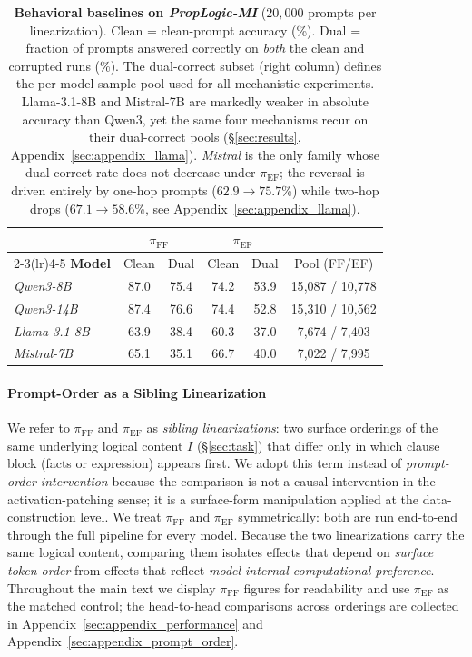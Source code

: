 \documentclass[11pt]{article}
\begin{document}
\begin{table}[t]
\centering
\small
\setlength{\tabcolsep}{3.5pt}
\begin{tabular}{l cc cc c}
\toprule
& \multicolumn{2}{c}{$\pi_{\mathrm{FF}}$} & \multicolumn{2}{c}{$\pi_{\mathrm{EF}}$} & \\
\cmidrule(lr){2-3}\cmidrule(lr){4-5}
\textbf{Model} & Clean & Dual & Clean & Dual & Pool (FF/EF) \\
\midrule
\textit{Qwen3-8B}            & 87.0 & 75.4 & 74.2 & 53.9 & 15{,}087 / 10{,}778 \\
\textit{Qwen3-14B}           & 87.4 & 76.6 & 74.4 & 52.8 & 15{,}310 / 10{,}562 \\
\textit{Llama-3.1-8B}        & 63.9 & 38.4 & 60.3 & 37.0 & \phantom{0}7{,}674 / \phantom{0}7{,}403 \\
\textit{Mistral-7B}          & 65.1 & 35.1 & 66.7 & 40.0 & \phantom{0}7{,}022 / \phantom{0}7{,}995 \\
\bottomrule
\end{tabular}
\caption{\textbf{Behavioral baselines on \textit{PropLogic-MI}} ($20{,}000$ prompts per linearization). Clean = clean-prompt accuracy (\%). Dual = fraction of prompts answered correctly on \emph{both} the clean and corrupted runs (\%). The dual-correct subset (right column) defines the per-model sample pool used for all mechanistic experiments. Llama-3.1-8B and Mistral-7B are markedly weaker in absolute accuracy than Qwen3, yet the same four mechanisms recur on their dual-correct pools (\S\ref{sec:results}, Appendix~\ref{sec:appendix_llama}). \textit{Mistral} is the only family whose dual-correct rate does not decrease under $\pi_{\mathrm{EF}}$; the reversal is driven entirely by one-hop prompts ($62.9 \to 75.7$\%) while two-hop drops ($67.1 \to 58.6$\%, see Appendix~\ref{sec:appendix_llama}).}
\label{tab:dataset_baselines}
\vspace{-0.6em}
\end{table}

\paragraph{Prompt-Order as a Sibling Linearization}
We refer to $\pi_{\mathrm{FF}}$ and $\pi_{\mathrm{EF}}$ as \emph{sibling linearizations}: two surface orderings of the same underlying logical content $I$ (§\ref{sec:task}) that differ only in which clause block (facts or expression) appears first. We adopt this term instead of \emph{prompt-order intervention} because the comparison is not a causal intervention in the activation-patching sense; it is a surface-form manipulation applied at the data-construction level.
We treat $\pi_{\mathrm{FF}}$ and $\pi_{\mathrm{EF}}$ symmetrically: both are run end-to-end through the full pipeline for every model. Because the two linearizations carry the same logical content, comparing them isolates effects that depend on \emph{surface token order} from effects that reflect \emph{model-internal computational preference}. Throughout the main text we display $\pi_{\mathrm{FF}}$ figures for readability and use $\pi_{\mathrm{EF}}$ as the matched control; the head-to-head comparisons across orderings are collected in Appendix~\ref{sec:appendix_performance} and Appendix~\ref{sec:appendix_prompt_order}.
\end{document}
